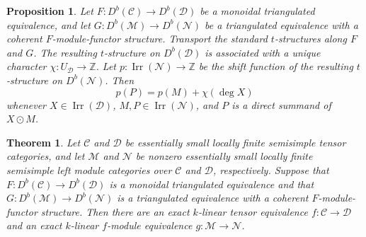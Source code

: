 \documentclass[10pt,a4paper]{amsart}
\newtheorem{theorem}{Theorem}
\newtheorem{proposition}{Proposition}
\newcommand{\C}{\mathcal C}
\newcommand{\D}{\mathcal D}
\newcommand{\Irr}{\operatorname{Irr}}
\newcommand{\M}{\mathcal M}
\newcommand{\N}{\mathcal N}
\begin{document}
\begin{proposition}\label{prop:transported-pair}
Let $F: D^b(\C)\to D^b(\D)$ be a monoidal triangulated equivalence, and let $G: D^b(\M)\to D^b(\N)$ be a triangulated equivalence with a coherent $F$-module-functor structure. Transport the standard $t$-structures along $F$ and $G$. The resulting $t$-structure on $D^b(\D)$ is associated with a unique character $\chi: U_{\D}\to\mathbb Z$. Let $p:\Irr(\N)\to\mathbb Z$ be the shift function of the resulting $t$-structure on $D^b(\N)$. Then
\[
p(P)=p(M)+\chi(\deg X)
\]
whenever $X\in\Irr(\D)$, $M,P\in\Irr(\N)$, and $P$ is a direct summand of $X\odot M$.
\end{proposition}

\begin{theorem}\label{thm:simultaneous-reconstruction}
Let $\C$ and $\D$ be essentially small locally finite semisimple tensor categories, and let $\M$ and $\N$ be nonzero essentially small locally finite semisimple left module categories over $\C$ and $\D$, respectively. Suppose that $F: D^b(\C)\to D^b(\D)$ is a monoidal triangulated equivalence and that $G: D^b(\M)\to D^b(\N)$ is a triangulated equivalence with a coherent $F$-module-functor structure. Then there are an exact $k$-linear tensor equivalence $f:\C\to\D$ and an exact $k$-linear $f$-module equivalence $g:\M\to\N$.
\end{theorem}
\end{document}
